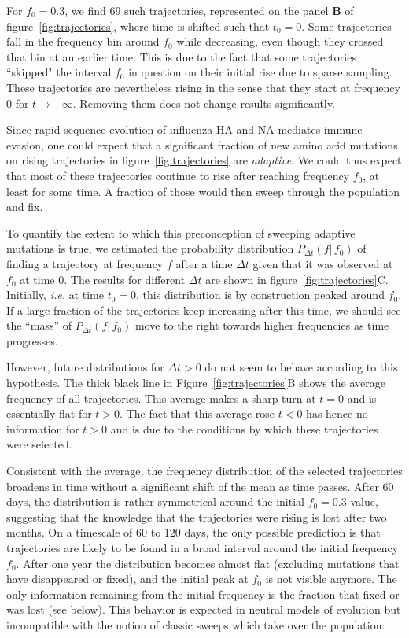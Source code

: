 \documentclass[reprint,amsmath,amssymb,superscriptaddress,showpacs,pre]{revtex4-1}
\begin{document}
For $f_0=0.3$, we find 69 such trajectories, represented on the panel \textbf{B} of figure~\ref{fig:trajectories}, where time is shifted such that $t_0 = 0$. 
Some trajectories fall in the frequency bin around $f_0$ while decreasing, even though they crossed that bin at an earlier time. 
This is due to the fact that some trajectories ``skipped" the interval $f_0$ in question on their initial rise due to sparse sampling. 
These trajectories are nevertheless rising in the sense that they start at frequency 0 for $t\rightarrow -\infty$. 
Removing them does not change results significantly. 

Since rapid sequence evolution of influenza HA and NA mediates immune evasion, one could expect that a significant fraction of new amino acid mutations on rising trajectories in figure~\ref{fig:trajectories} are \emph{adaptive}. 
We could thus expect that most of these trajectories continue to rise after reaching frequency $f_0$, at least for some time. 
A fraction of those would then sweep through the population and fix. 

To quantify the extent to which this preconception of sweeping adaptive mutations is true, we estimated the probability distribution $P_{\Delta t}(f\vert\,f_0)$ of finding a trajectory at frequency $f$ after a time $\Delta t$ given that it was observed at $f_0$ at time $0$. 
The results for different $\Delta t$ are shown in figure~\ref{fig:trajectories}C. 
Initially, \emph{i.e.} at time $t_0=0$, this distribution is by construction peaked around $f_0$. 
If a large fraction of the trajectories keep increasing after this time, we should see the ``mass'' of $P_{\Delta t}(f\vert\,f_0)$ move to the right towards higher frequencies as time progresses.

However, future distributions for $\Delta t >0$ do not seem to behave according to this hypothesis. 
The thick black line in Figure~\ref{fig:trajectories}B shows the average frequency of all trajectories. 
This average makes a sharp turn at $t=0$ and is essentially flat for $t>0$.
The fact that this average rose $t<0$ has hence no information for $t>0$ and is due to the conditions by which these trajectories were selected.

Consistent with the average, the frequency distribution of the selected trajectories broadens in time without a significant shift of the mean as time passes. 
After 60 days, the distribution is rather symmetrical around the initial $f_0=0.3$ value, suggesting that the knowledge that the trajectories were rising is lost after two months. 
On a timescale of 60 to 120 days, the only possible prediction is that trajectories are likely to be found in a broad interval around the initial frequency $f_0$. 
After one year the distribution becomes almost flat (excluding mutations that have disappeared or fixed), and the initial peak at $f_0$ is not visible anymore. 
The only information remaining from the initial frequency is the fraction that fixed or was lost (see below). 
This behavior is expected in neutral models of evolution \citep{kimura_diffusion_1964} but incompatible with the notion of classic sweeps which take over the population. 
\end{document}
